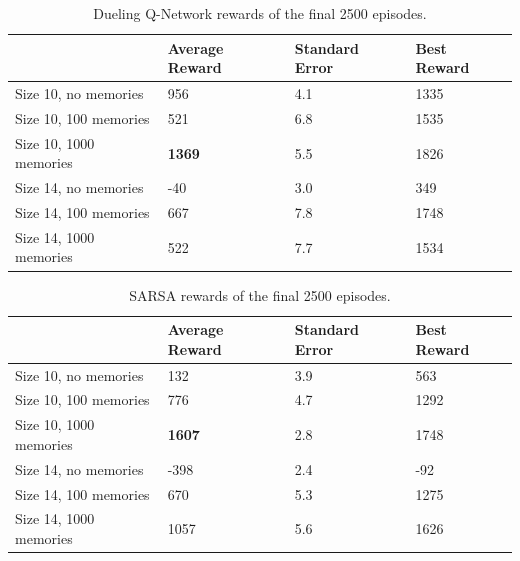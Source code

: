 \begin{table}[H]
\begin{tabular}{l|l|l|l|}
\cline{2-4}
\textbf{} & Average Reward & Standard Error & Best Reward \\ \hline
\multicolumn{1}{|l|}{Size 10, no memories} & 956 & 4.1 & 1335 \\ \hline
\multicolumn{1}{|l|}{Size 10, 100 memories} & 521 & 6.8 & 1535 \\ \hline
\multicolumn{1}{|l|}{Size 10, 1000 memories} & \textbf{1369} & 5.5 & 1826 \\ \hline
\multicolumn{1}{|l|}{Size 14, no memories} & -40 & 3.0 & 349 \\ \hline
\multicolumn{1}{|l|}{Size 14, 100 memories} & 667 & 7.8 & 1748 \\ \hline
\multicolumn{1}{|l|}{Size 14, 1000 memories} & 522 & 7.7 & 1534 \\ \hline
\end{tabular}
\caption{Dueling Q-Network rewards of the final 2500 episodes.}
\label{tab:2500duel}
\end{table}
\begin{table}[H]
\begin{tabular}{l|l|l|l|}
\cline{2-4}
\textbf{} & Average Reward & Standard Error & Best Reward \\ \hline
\multicolumn{1}{|l|}{Size 10, no memories} & 132 & 3.9 & 563 \\ \hline
\multicolumn{1}{|l|}{Size 10, 100 memories} & 776 & 4.7 & 1292 \\ \hline
\multicolumn{1}{|l|}{Size 10, 1000 memories} & \textbf{1607} & 2.8 & 1748 \\ \hline
\multicolumn{1}{|l|}{Size 14, no memories} & -398 & 2.4 & -92 \\ \hline
\multicolumn{1}{|l|}{Size 14, 100 memories} & 670 & 5.3 & 1275 \\ \hline
\multicolumn{1}{|l|}{Size 14, 1000 memories} & 1057 & 5.6 & 1626 \\ \hline
\end{tabular}
\caption{SARSA rewards of the final 2500 episodes.}
\label{tab:2500sarsa}
\end{table}
\clearpage
